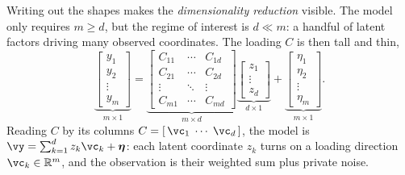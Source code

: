 \documentclass[11pt]{article}
\theoremstyle{plain}
\theoremstyle{definition}
\theoremstyle{remark}
\theoremstyle{definition}
\newcommand{\veta}{\bm{\eta}}
\begin{document}
Writing out the shapes makes the \textit{dimensionality reduction} visible. The model
only requires $m \geq d$, but the regime of interest is $d \ll m$: a handful of
latent factors driving many observed coordinates. The loading $C$ is then tall
and thin,
\begin{equation}\label{eq:ppca-shapes}
    \underbrace{\begin{bmatrix} y_1 \\ y_2 \\ \vdots \\ y_m \end{bmatrix}}_{m \times 1}
    =
    \underbrace{\begin{bmatrix}
        C_{11} & \cdots & C_{1d} \\
        C_{21} & \cdots & C_{2d} \\
        \vdots & \ddots & \vdots \\
        C_{m1} & \cdots & C_{md}
    \end{bmatrix}}_{m \times d}
    \underbrace{\begin{bmatrix} z_1 \\ \vdots \\ z_d \end{bmatrix}}_{d \times 1}
    +
    \underbrace{\begin{bmatrix} \eta_1 \\ \eta_2 \\ \vdots \\ \eta_m \end{bmatrix}}_{m \times 1} .
\end{equation}
Reading $C$ by its columns $C = [\,\vc_1 \;\cdots\; \vc_d\,]$, the model is
$\vy = \sum_{k=1}^d z_k \vc_k + \veta$: each latent coordinate $z_k$ turns on a
loading direction $\vc_k \in \reals^m$, and the observation is their weighted sum
plus private noise.
\end{document}

